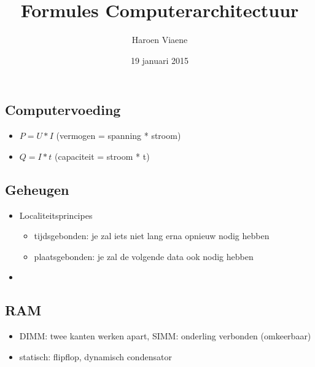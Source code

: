 \documentclass[11pt]{article}
\title{Formules Computerarchitectuur}
\author{Haroen Viaene}
\date{19 januari 2015}
\let\originalitem\item
\renewcommand{\item}{\originalitem[]}
\newcommand{\Newpage}{\end{preview}\begin{preview}}
\begin{document}
\begin{preview}


\maketitle

\Newpage

\section{Computervoeding}

\begin{itemize}
	\item $P = U * I$ (vermogen = spanning * stroom)
	\item $Q = I * t$ (capaciteit = stroom * t)
\end{itemize}

\Newpage

\section{Geheugen}

\begin{itemize}
	\item Localiteitsprincipes
	\begin{itemize}
		\item tijdsgebonden: je zal iets niet lang erna opnieuw nodig hebben
		\item plaatsgebonden: je zal de volgende data ook nodig hebben
	\end{itemize}
	\item 
\end{itemize}

\subsection{RAM}

\begin{itemize}
	\item DIMM: twee kanten werken apart, SIMM: onderling verbonden (omkeerbaar)
	\item statisch: flipflop, dynamisch condensator
\end{itemize}

\end{preview}
\end{document}
